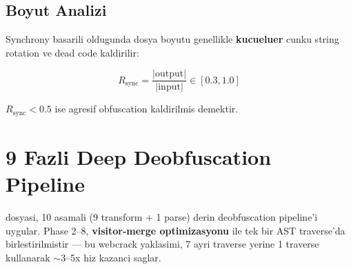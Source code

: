 \subsection{Boyut Analizi}

Synchrony basarili oldugunda dosya boyutu genellikle \textbf{kucueluer} cunku string rotation ve dead code kaldirilir:

\begin{equation}
R_{\text{sync}} = \frac{|\text{output}|}{|\text{input}|} \in [0.3, 1.0]
\end{equation}

$R_{\text{sync}} < 0.5$ ise agresif obfuscation kaldirilmis demektir.


\section{9 Fazli Deep Deobfuscation Pipeline}
\label{sec:deep-deobf-detail}

 dosyasi, 10 asamali (9 transform + 1 parse) derin deobfuscation pipeline'i uygular. Phase 2--8, \textbf{visitor-merge optimizasyonu} ile tek bir AST traverse'da birlestirilmistir --- bu webcrack yaklasimi, 7 ayri traverse yerine 1 traverse kullanarak $\sim$3--5x hiz kazanci saglar.

